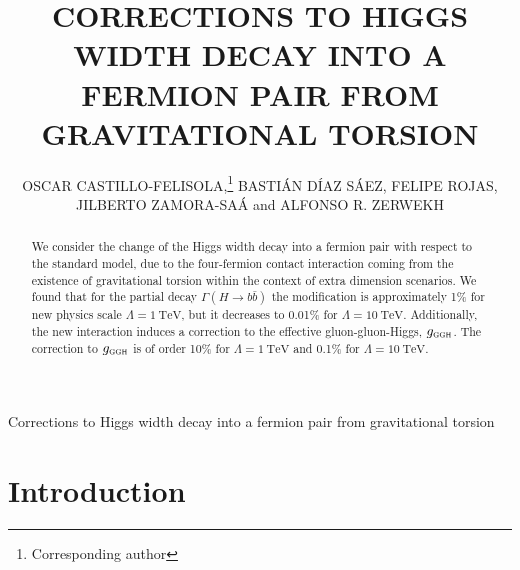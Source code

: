 \documentclass{ws-mpla}
\renewcommand{\(}{\left(}
\renewcommand{\)}{\right)}
\renewcommand{\[}{\left[}
\renewcommand{\]}{\right]}
\newcommand\UTFSM{Departamento de F\'\i sica, Universidad T\'{e}cnica Federico Santa Mar\'\i a, \\ Casilla 110-V, Valpara\'\i so, Chile}
\newcommand\CCTVal{Centro Cient\'\i fico Tecnol\'ogico de Valpara\'\i so, \\ Casilla 110-V, Valpara\'\i so, Chile}
\begin{document}
{Corrections to Higgs width decay into a fermion pair from gravitational torsion}

\catchline{}{}{}{}{}


\title{CORRECTIONS TO HIGGS WIDTH DECAY INTO A FERMION PAIR FROM GRAVITATIONAL TORSION}

\author{OSCAR {CASTILLO-FELISOLA},\footnote{Corresponding author} \quad BASTI\'AN {D\'IAZ S\'AEZ}, \quad  FELIPE {ROJAS}, \\ JILBERTO {ZAMORA-SA\'A} and ALFONSO R. {ZERWEKH}}

\address{\UTFSM, and \\ \CCTVal. \\ o.castillo.felisola@gmail.com}

\maketitle



\begin{abstract}
  We consider the change of the Higgs width decay into a fermion pair  with respect to the standard model, due to the four-fermion contact interaction coming from the existence of gravitational torsion within the context of extra dimension scenarios. We found that for the partial decay \mbox{$\Gamma(H \to b \bar{b})$} the modification is approximately \num{1}\% for new physics scale $\Lambda = \SI{1}{\TeV}$, but it decreases to \num{.01}\% for $\Lambda = \SI{10}{\TeV}$. Additionally, the new interaction induces a correction to the effective gluon-gluon-Higgs, $g_{\textsc{ggh}}$. The correction to $g_{\textsc{ggh}}$ is of order \num{10}\% for $\Lambda = \SI{1}{\TeV}$ and \num{.1}\% for $\Lambda = \SI{10}{\TeV}$.
\end{abstract}




\section{Introduction}\label{intro}
\end{document}
